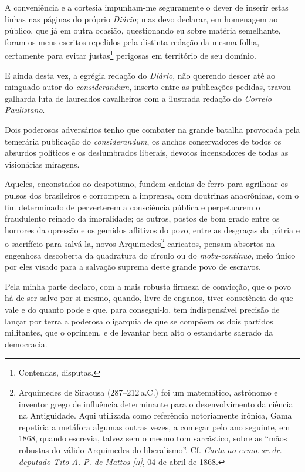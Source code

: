 A conveniência e a cortesia impunham-me seguramente o dever de inserir
estas linhas nas páginas do próprio \emph{Diário}; mas devo declarar, em
homenagem ao público, que já em outra ocasião, questionando eu sobre
matéria semelhante, foram os meus escritos repelidos pela distinta
redação da mesma folha, certamente para evitar justas\footnote{
  Contendas, disputas.} perigosas em território de seu domínio.

E ainda desta vez, a egrégia redação do \emph{Diário}, não querendo
descer até ao minguado autor do \textit{considerandum}, inserto entre as
publicações pedidas, travou galharda luta de laureados cavalheiros com a
ilustrada redação do \emph{Correio Paulistano}.

Dois poderosos adversários tenho que combater na grande batalha
provocada pela temerária publicação do \textit{considerandum}, os anchos
conservadores de todos os absurdos políticos e os deslumbrados liberais,
devotos incensadores de todas as visionárias miragens.

Aqueles, enconstados ao despotismo, fundem cadeias de ferro para
agrilhoar os pulsos dos brasileiros e corrompem a imprensa, com
doutrinas anacrônicas, com o fim determinado de perverterem a
consciência pública e perpetuarem o fraudulento reinado da imoralidade;
os outros, postos de bom grado entre os horrores da opressão e os
gemidos aflitivos do povo, entre as desgraças da pátria e o sacrifício
para salvá-la, novos Arquimedes\footnote{Arquimedes de Siracusa (287--212\,a.C.) 
foi um matemático, astrônomo e inventor grego de
  influência determinante para o desenvolvimento da ciência na
  Antiguidade. Aqui utilizada como referência notoriamente irônica, Gama
  repetiria a metáfora algumas outras vezes, a começar pelo ano
  seguinte, em 1868, quando escrevia, talvez sem o mesmo tom sarcástico,
  sobre as ``mãos robustas do válido Arquimedes do liberalismo''. Cf.
  \emph{Carta ao exmo.\,sr.\,dr.\,deputado Tito A. P. de Mattos {[}\textsc{ii}{]}},
  04 de abril de 1868.\label{arquimedes}} caricatos, pensam absortos na engenhosa descoberta da
quadratura do círculo ou do \emph{motu-contínuo}, meio único por eles
visado para a salvação suprema deste grande povo de escravos.

Pela minha parte declaro, com a mais robusta firmeza de convicção, que o
povo há de ser salvo por si mesmo, quando, livre de enganos, tiver
consciência do que vale e do quanto pode e que, para consegui-lo, tem
indispensável precisão de lançar por terra a poderosa oligarquia de que
se compõem os dois partidos militantes, que o oprimem, e de levantar bem
alto o estandarte sagrado da democracia.

